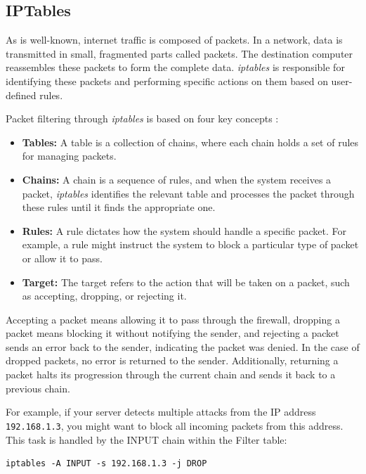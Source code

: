 \documentclass[conference]{IEEEtran}
\begin{document}
\subsection{IPTables}

As is well-known, internet traffic is composed of packets. In a network, data is transmitted in small, fragmented parts called packets. The destination computer reassembles these packets to form the complete data. \textit{iptables} is responsible for identifying these packets and performing specific actions on them based on user-defined rules.

Packet filtering through \textit{iptables} is based on four key concepts \cite{roxo}:

\begin{itemize}
    \item \textbf{Tables:} A table is a collection of chains, where each chain holds a set of rules for managing packets.
    \item \textbf{Chains:} A chain is a sequence of rules, and when the system receives a packet, \textit{iptables} identifies the relevant table and processes the packet through these rules until it finds the appropriate one.
    \item \textbf{Rules:} A rule dictates how the system should handle a specific packet. For example, a rule might instruct the system to block a particular type of packet or allow it to pass.
    \item \textbf{Target:} The target refers to the action that will be taken on a packet, such as accepting, dropping, or rejecting it.
\end{itemize}

Accepting a packet means allowing it to pass through the firewall, dropping a packet means blocking it without notifying the sender, and rejecting a packet sends an error back to the sender, indicating the packet was denied. In the case of dropped packets, no error is returned to the sender. Additionally, returning a packet halts its progression through the current chain and sends it back to a previous chain.

For example, if your server detects multiple attacks from the IP address \texttt{192.168.1.3}, you might want to block all incoming packets from this address. This task is handled by the INPUT chain within the Filter table:

\begin{verbatim}
iptables -A INPUT -s 192.168.1.3 -j DROP
\end{verbatim}
\end{document}
